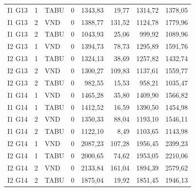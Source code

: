 \begin{longtable}{lrlrrrrr}
I1 G13 & 1 & TABU & 0 & 1343,83 & 19,77 & 1314,72 & 1378,05 \\
I1 G13 & 2 & VND & 0 & 1388,77 & 131,52 & 1124,78 & 1779,96 \\
I1 G13 & 2 & TABU & 0 & 1043,93 & 25,06 & 999,92 & 1089,96 \\
I2 G13 & 1 & VND & 0 & 1394,73 & 78,73 & 1295,89 & 1591,76 \\
I2 G13 & 1 & TABU & 0 & 1324,13 & 38,69 & 1257,82 & 1432,74 \\
I2 G13 & 2 & VND & 0 & 1300,27 & 109,83 & 1137,61 & 1559,77 \\
I2 G13 & 2 & TABU & 0 & 982,55 & 15,53 & 958,21 & 1035,47 \\
I1 G14 & 1 & VND & 0 & 1465,28 & 35,80 & 1409,90 & 1566,82 \\
I1 G14 & 1 & TABU & 0 & 1412,52 & 16,59 & 1390,50 & 1454,98 \\
I1 G14 & 2 & VND & 0 & 1350,33 & 88,04 & 1193,10 & 1546,11 \\
I1 G14 & 2 & TABU & 0 & 1122,10 & 8,49 & 1103,65 & 1143,98 \\
I2 G14 & 1 & VND & 0 & 2087,23 & 107,28 & 1956,45 & 2399,23 \\
I2 G14 & 1 & TABU & 0 & 2000,65 & 74,62 & 1953,05 & 2210,06 \\
I2 G14 & 2 & VND & 0 & 2133,84 & 161,04 & 1894,39 & 2579,62 \\
I2 G14 & 2 & TABU & 0 & 1875,04 & 19,92 & 1851,45 & 1946,13 \\
\bottomrule\end{longtable}
